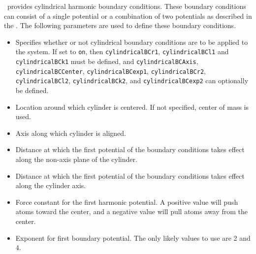 \NAMD\ provides cylindrical harmonic boundary conditions.  These 
boundary conditions can consist of a single potential or a 
combination of two potentials as described in the \PG.  
The following parameters are used to define these boundary conditions.  

\begin{itemize}

\item
{}
{Specifies whether or not cylindrical boundary conditions 
are to be applied to the system.  If 
set to {\tt on}, then {\tt cylindricalBCr1}, {\tt cylindricalBCl1} and {\tt cylindricalBCk1} 
must be defined, and {\tt cylindricalBCAxis}, {\tt cylindricalBCCenter}, {\tt cylindricalBCexp1}, {\tt cylindricalBCr2}, {\tt cylindricalBCl2},
{\tt cylindricalBCk2}, and {\tt cylindricalBCexp2} can optionally be 
defined.}

\item
{}
{Location around which cylinder is centered.  If not specified, center of mass is used.}

\item
{}
{Axis along which cylinder is aligned.}

\item
{}
{Distance at which the first potential of the boundary conditions takes
effect along the non-axis plane of the cylinder.}

\item
{}
{Distance at which the first potential of the boundary conditions takes
effect along the cylinder axis.}

\item
{}
{Force constant for the first harmonic potential.  A positive
value will push atoms toward the center, and a negative
value will pull atoms away from the center.}

\item
{}
{Exponent for first boundary potential.  The only likely values to
use are 2 and 4.}


\end{itemize}
